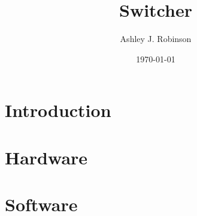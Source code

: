 \documentclass[12pt]{article}%
\begin{document}
\title{Switcher}
\author{Ashley J. Robinson}
\date{\today}
\maketitle
\section{Introduction}


\section{Hardware}


\section{Software}
\end{document}
